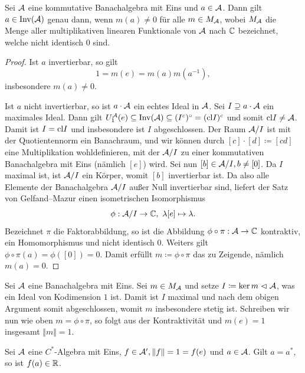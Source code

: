 \begin{theorem} \label{thm:invertierbar-gdw-nichtverschwindend-multiplikativ}
    Sei $\mathcal{A}$ eine kommutative Banachalgebra mit Eins und $a \in \mathcal{A}$. Dann gilt $a \in \operatorname*{Inv}(\mathcal{A})$ genau dann, wenn $m(a) \neq 0$ für alle $m \in M_{\mathcal{A}}$, wobei $M_{\mathcal{A}}$ die Menge aller multiplikativen linearen Funktionale von $\mathcal{A}$ nach $\mathbb{C}$ bezeichnet, welche nicht identisch $0$ sind.
\end{theorem}

\begin{proof}
    Ist $a$ invertierbar, so gilt
    $$ 1 = m(e) = m(a) m(a^{-1}), $$
    insbesondere $m(a) \neq 0$.

    Ist $a$ nicht invertierbar, so ist $a \cdot \mathcal{A}$ ein echtes Ideal in $\mathcal{A}$. Sei $I \supseteq a \cdot \mathcal{A}$ ein maximales Ideal. Dann gilt $U_1^{\mathcal{A}}(e) \subseteq \operatorname*{Inv}(\mathcal{A}) \subseteq (I^c)^\circ = (\mathrm{cl} I)^c$ und somit $\mathrm{cl} I \neq \mathcal{A}$. Damit ist $I = \mathrm{cl} I$ und insbesondere ist $I$ abgeschlossen. Der Raum $\mathcal{A} / I$ ist mit der Quotientennorm ein Banachraum, und wir können durch $[c] \cdot [d] \coloneqq [cd]$ eine Multiplikation wohldefinieren, mit der $\mathcal{A} / I$ zu einer kommutativen Banachalgebra mit Eins (nämlich $[e]$) wird. Sei nun $[b] \in \mathcal{A} / I, b \neq [0]$. Da $I$ maximal ist, ist $\mathcal{A} / I$ ein Körper, womit $[b]$ invertierbar ist. Da also alle Elemente der Banachalgebra $\mathcal{A} / I$ außer Null invertierbar sind, liefert der Satz von Gelfand--Mazur einen isometrischen Isomorphismus
    $$ \phi : \mathcal{A} / I \to \mathbb{C}, \ \lambda [e] \mapsto \lambda. $$
    Bezeichnet $\pi$ die Faktorabbildung, so ist die Abbildung $\phi \circ \pi : \mathcal{A} \to \mathbb{C}$ kontraktiv, ein Homomorphismus und nicht identisch $0$. Weiters gilt $\phi \circ \pi(a) = \phi([0]) = 0$. Damit erfüllt $m \coloneqq \phi \circ \pi$ das zu Zeigende, nämlich $m(a) = 0$.
\end{proof}

\begin{remark} \label{rem:gelfandraum-beschränkt}
    Sei $\mathcal{A}$ eine Banachalgebra mit Eins. Sei $m \in M_{\mathcal{A}}$ und setze $I \coloneqq \ker m \vartriangleleft \mathcal{A}$, was ein Ideal von Kodimension $1$ ist. Damit ist $I$ maximal und nach dem obigen Argument somit abgeschlossen, womit $m$ insbesondere stetig ist. Schreiben wir nun wie oben $m = \phi \circ \pi$, so folgt aus der Kontraktivität und $m(e) = 1$ insgesamt $\Vert m \Vert = 1$.
\end{remark}

\begin{lemma} \label{lem:funktional-reell-auf-selbstadjungierten}
    Sei $\mathcal{A}$ eine $C^*$-Algebra mit Eins, $f \in \mathcal{A}', \Vert f \Vert = 1 = f(e)$ und $a \in \mathcal{A}$. Gilt $a = a^*$, so ist $f(a) \in \mathbb{R}$.
\end{lemma}

